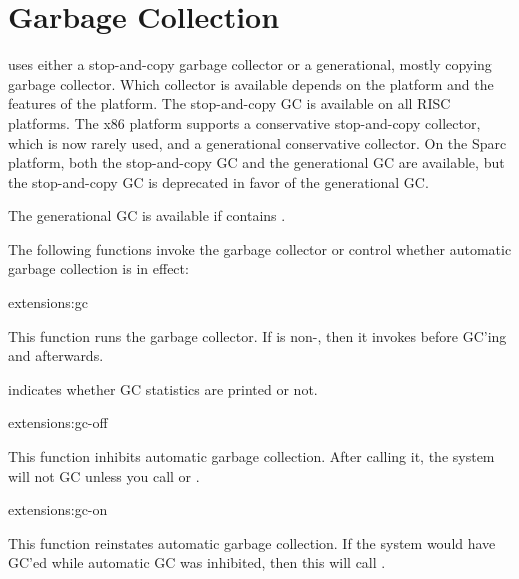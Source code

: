 \section{Garbage Collection}

\cmucl{} uses either a stop-and-copy garbage collector or a
generational, mostly copying garbage collector.  Which collector is
available depends on the platform and the features of the platform.
The stop-and-copy GC is available on all RISC platforms.  The x86
platform supports a conservative stop-and-copy collector, which is now
rarely used, and a generational conservative collector.  On the Sparc
platform, both the stop-and-copy GC and the generational GC are
available, but the stop-and-copy GC is deprecated in favor of the
generational GC.  

The generational GC is available if  contains
.


The following functions invoke the garbage collector or control whether
automatic garbage collection is in effect:

\begin{defun}[-cheney]{extensions:}{gc}{}
  
  This function runs the garbage collector.  If
   is non-\nil, then it invokes
   before GC'ing and
   afterwards.
  
   indicates whether GC statistics are printed or
  not. 

\end{defun}

\begin{defun}{extensions:}{gc-off}{}
  
  This function inhibits automatic garbage collection.  After calling
  it, the system will not GC unless you call  or
  .
\end{defun}

\begin{defun}{extensions:}{gc-on}{}
  
  This function reinstates automatic garbage collection.  If the
  system would have GC'ed while automatic GC was inhibited, then this
  will call .
\end{defun}

